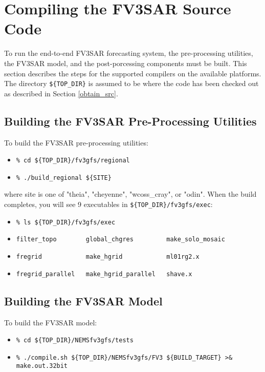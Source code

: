 \section{Compiling the FV3SAR Source Code}

To run the end-to-end FV3SAR forecasting system, the pre-processing utilities, the FV3SAR model, and the
post-porcessing components must be built.  This section describes the steps for the supported compilers
on the available platforms.  The directory \verb|${TOP_DIR}| is assumed to be where the code has been checked 
out as described in Section \ref{obtain_src}.

\subsection{Building the FV3SAR Pre-Processing Utilities}

To build the FV3SAR pre-processing utilities:

\begin{itemize}
  \item[] \verb|% cd ${TOP_DIR}/fv3gfs/regional| 
  \item[] \verb|% ./build_regional ${SITE}|
\end{itemize}

where site is one of "theia", "cheyenne", "wcoss\_cray", or "odin".  When the build completes, you will see 9
executables in \verb|${TOP_DIR}/fv3gfs/exec|:

\begin{itemize}
  \item[] \verb|% ls ${TOP_DIR}/fv3gfs/exec| 
  \item[] \verb|filter_topo        global_chgres         make_solo_mosaic    | 
  \item[] \verb|fregrid            make_hgrid            ml01rg2.x           | 
  \item[] \verb|fregrid_parallel   make_hgrid_parallel   shave.x             | 
\end{itemize}

\subsection{Building the FV3SAR Model}

To build the FV3SAR model:

\begin{itemize}
  \item[] \verb|% cd ${TOP_DIR}/NEMSfv3gfs/tests| 
  \item[] \verb|% ./compile.sh ${TOP_DIR}/NEMSfv3gfs/FV3 ${BUILD_TARGET} >& make.out.32bit|
\end{itemize}


